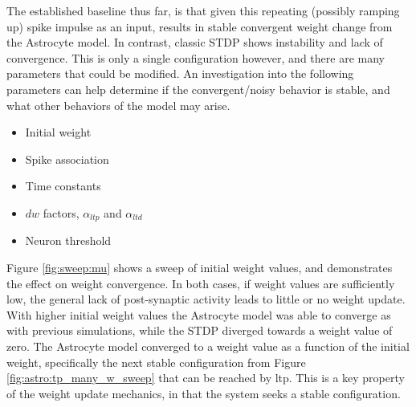 

The established baseline thus far, is that given this repeating (possibly
ramping up) spike impulse as an input, results in stable convergent weight
change from the Astrocyte model. In contrast, classic STDP shows instability and
lack of convergence. This is only a single configuration however, and there are many
parameters that could be modified. An investigation into the following
parameters can help determine if the convergent/noisy behavior is stable,
and what other behaviors of the model may arise.

\begin{itemize}
\item Initial weight
\item Spike association
\item Time constants
\item $dw$ factors, $\alpha_{ltp}$ and $\alpha_{ltd}$
\item Neuron threshold
\end{itemize}

Figure \ref{fig:sweep:mu} shows a sweep of initial weight values, and
demonstrates the effect on weight convergence. In both cases, if weight values
are sufficiently low, the general lack of post-synaptic activity leads to little
or no weight update. With higher initial weight values the Astrocyte model was
able to converge as with previous simulations, while the STDP diverged towards a
weight value of zero. The Astrocyte model converged to a weight value as a
function of the initial weight, specifically the next stable configuration from
Figure \ref{fig:astro:tp_many_w_sweep} that can be reached by \Gls{ltp}. This is a key
property of the weight update mechanics, in that the system seeks a stable
configuration.



